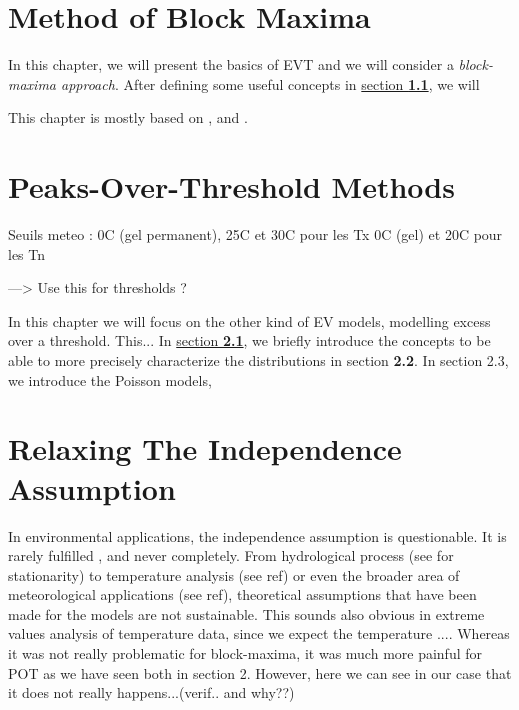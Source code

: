 \documentclass[11pt,a4paper,openany ]{book}
\begin{document}
\setcounter{mtc}{1}
\chapter{Method of Block Maxima} \label{sec::1}
\vspace{-1cm}
\minitoc \thispagestyle{empty}
 \vspace{1.5cm}

In this chapter, we will present the basics of EVT and we will consider a 
\textit{block-maxima approach}. After defining some useful concepts in 
\hyperref[sec::1.1]{section \textbf{1.1}}, we will

This chapter is mostly based on \citet[chapter 3]{coles_introduction_2001}, \citet[chapter 2]{beirlant_statistics_2006} and \citet{reiss_statistical_2007}.

\newpage




\chapter{Peaks-Over-Threshold Methods}\label{sec::2}
\vspace{-1cm}
\minitoc \thispagestyle{empty}
 \vspace{1.5cm}

Seuils meteo : 0C (gel permanent), 25C et 30C pour les Tx
0C (gel) et 20C pour les Tn

---> Use this for thresholds ?

In this chapter we will focus on the other kind of EV models, modelling excess over a 
threshold. This...
In \hyperref[sec::2.1]{section \textbf{2.1}}, we briefly introduce the concepts to be able 
to more precisely characterize
 the distributions in section \textbf{2.2}. In section 2.3, we introduce the Poisson 
 models, 

\newpage




\chapter{Relaxing The Independence Assumption}\label{sec::3}
\vspace{-1cm}
\minitoc\thispagestyle{empty}

In environmental applications, the independence assumption is questionable. It is rarely fulfilled \cite{}, and never completely. From hydrological process (see \citet{milly_stationarity_2008} for stationarity) to temperature analysis (see ref) or even the broader area of meteorological applications (see ref), theoretical assumptions that have been made for the models are not sustainable. This sounds also obvious in extreme values analysis of temperature data, since we expect the temperature .... Whereas it was not really problematic for block-maxima, it was much more painful for POT as we have seen  both in section 2. 
However, here we can see in our case that it does not really happens...(verif.. and why??)
\end{document}
